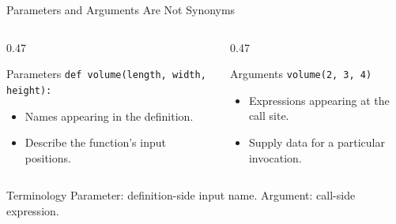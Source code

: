 \documentclass[aspectratio=169,10pt]{beamer}
\begin{document}

\begin{frame}{Parameters and Arguments Are Not Synonyms}
  \begin{columns}[T,onlytextwidth]
    \begin{column}{0.47\textwidth}
      \begin{block}{Parameters}
        \texttt{def volume(length, width, height):}
      \end{block}
      \begin{itemize}
        \item Names appearing in the definition.
        \item Describe the function's input positions.
      \end{itemize}
    \end{column}

    \begin{column}{0.47\textwidth}
      \begin{block}{Arguments}
        \texttt{volume(2, 3, 4)}
      \end{block}
      \begin{itemize}
        \item Expressions appearing at the call site.
        \item Supply data for a particular invocation.
      \end{itemize}
    \end{column}
  \end{columns}

  \begin{alertblock}{Terminology}
    Parameter: definition-side input name. Argument: call-side expression.
  \end{alertblock}
\end{frame}
\end{document}
